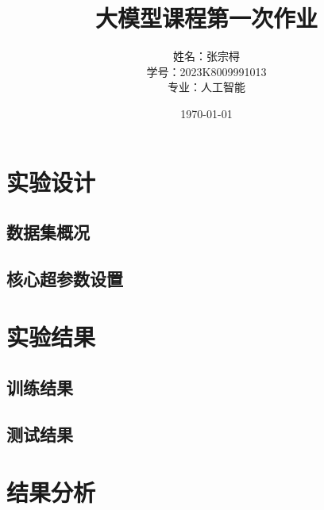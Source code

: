 \documentclass[a4paper,12pt]{ctexart} %
\title{\textbf{大模型课程第一次作业}}
\author{姓名：张宗桪 \\ 学号：2023K8009991013 \\ 专业：人工智能}
\date{\today}
\begin{document}
\pagestyle{plain} %

\maketitle
\thispagestyle{empty} %
\newpage

\tableofcontents
\newpage
\section{实验设计}
\subsection{数据集概况}
\subsection{核心超参数设置}
\section{实验结果}
\subsection{训练结果}
\subsection{测试结果}
\section{结果分析}
\end{document}
